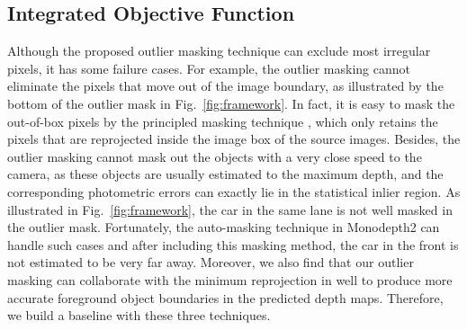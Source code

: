 \documentclass[letterpaper, 10 pt, conference]{ieeeconf}
\begin{document}
\subsection{Integrated Objective Function}
\label{sec:objective}
Although the proposed outlier masking technique can exclude most irregular pixels, it has some failure cases. 
For example, the outlier masking cannot eliminate the pixels that move out of the image boundary, as illustrated by the bottom of the outlier mask in Fig.~\ref{fig:framework}. 
In fact, it is easy to mask the out-of-box pixels by the principled masking technique \cite{mahjourian2018unsupervised}, which only retains the pixels that are reprojected inside the image box of the source images. 
Besides, the outlier masking cannot mask out the objects with a very close speed to the camera, as these objects are usually estimated to the maximum depth, and the corresponding photometric errors can exactly lie in the statistical inlier region. 
As illustrated in Fig.~\ref{fig:framework}, the car in the same lane is not well masked in the outlier mask. Fortunately, the auto-masking technique in Monodepth2 \cite{godard2019digging} can handle such cases and after including this masking method, the car in the front is not estimated to be very far away. Moreover, we also find that our outlier masking can collaborate with the minimum reprojection in \cite{godard2019digging} well to produce more accurate foreground object boundaries in the predicted depth maps. 
Therefore, we build a baseline with these three techniques. 
\end{document}
